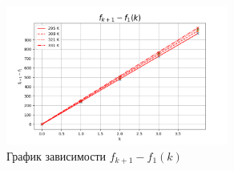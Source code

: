 \documentclass[a4paper]{article}
\begin{document}
\begin{figure}
    \centering
    \includegraphics[width=0.65\textwidth]{full.png}
    \caption{График зависимости $f_{k+1}-f_{1}(k)$}
\end{figure}
\end{document}
